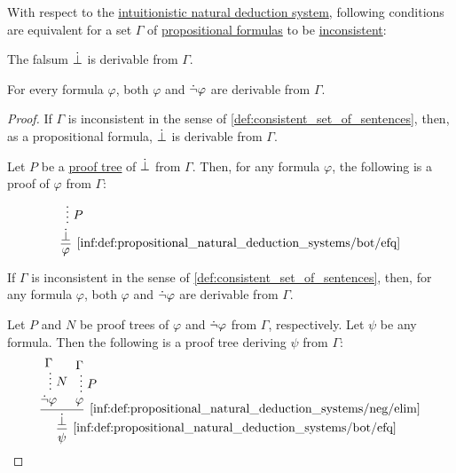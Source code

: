 \begin{proposition}\label{thm:propositional_consistent_set}
  With respect to the \hyperref[def:propositional_natural_deduction_systems]{intuitionistic natural deduction system}, following conditions are equivalent for a set \( \Gamma \) of \hyperref[def:propositional_syntax/formula]{propositional formulas} to be \hyperref[def:consistent_set_of_sentences]{inconsistent}:
  \begin{thmenum}
     The falsum \( \dot{\bot} \) is derivable from \( \Gamma \).

     For every formula \( \varphi \), both \( \varphi \) and \( \dot{\neg} \varphi \) are derivable from \( \Gamma \).
  \end{thmenum}
\end{proposition}
\begin{proof}

  \SufficiencySubProof* If \( \Gamma \) is inconsistent in the sense of \cref{def:consistent_set_of_sentences}, then, as a propositional formula, \( \dot{\bot} \) is derivable from \( \Gamma \).

  \NecessitySubProof* Let \( P \) be a \hyperref[def:natural_deduction_proof_tree]{proof tree} of \( \dot{\bot} \) from \( \Gamma \). Then, for any formula \( \varphi \), the following is a proof of \( \varphi \) from \( \Gamma \):
  \begin{equation*}
    \begin{prooftree}
      \hypo{}
      \ellipsis { \( P \) } { \synbot }
      \infer1[\ref{inf:def:propositional_natural_deduction_systems/bot/efq}]{ \varphi }.
    \end{prooftree}
  \end{equation*}


  \SufficiencySubProof* If \( \Gamma \) is inconsistent in the sense of \cref{def:consistent_set_of_sentences}, then, for any formula \( \varphi \), both \( \varphi \) and \( \dot{\neg} \varphi \) are derivable from \( \Gamma \).

  \NecessitySubProof* Let \( P \) and \( N \) be proof trees of \( \varphi \) and \( \dot{\neg} \varphi \) from \( \Gamma \), respectively. Let \( \psi \) be any formula. Then the following is a proof tree deriving \( \psi \) from \( \Gamma \):
  \begin{equation*}
    \begin{prooftree}
      \hypo{ \Gamma }
      \ellipsis { \( N \) } { \synneg \varphi }

      \hypo{ \Gamma }
      \ellipsis { \( P \) } { \varphi }

      \infer2[\ref{inf:def:propositional_natural_deduction_systems/neg/elim}]{ \synbot }.

      \infer1[\ref{inf:def:propositional_natural_deduction_systems/bot/efq}]{ \psi }.
    \end{prooftree}
  \end{equation*}
\end{proof}

